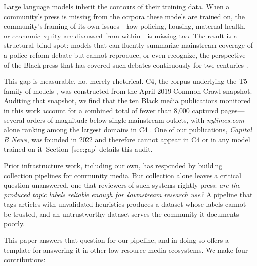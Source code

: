 \documentclass[letterpaper,twocolumn,10pt]{article}
\begin{document}
Large language models inherit the contours of their training data. When a
community's press is missing from the corpora these models are trained on,
the community's framing of its own issues---how policing, housing,
maternal health, or economic equity are discussed from within---is missing
too. The result is a structural blind spot: models that can fluently
summarize mainstream coverage of a police-reform debate but cannot
reproduce, or even recognize, the perspective of the Black press that has
covered such debates continuously for two centuries
\cite{washburn2006}.

This gap is measurable, not merely rhetorical. C4, the corpus underlying
the T5 family of models \cite{raffel2020}, was constructed from the April
2019 Common Crawl snapshot. Auditing that snapshot, we find that the ten
Black media publications monitored in this work account for a combined
total of fewer than 8{,}000 captured pages---several orders of magnitude
below single mainstream outlets, with \emph{nytimes.com} alone ranking
among the largest domains in C4 \cite{dodge2021}. One of our publications,
\emph{Capital B News}, was founded in 2022 and therefore cannot appear in
C4 or in any model trained on it. Section~\ref{sec:gap} details this audit.

Prior infrastructure work, including our own, has responded by building
collection pipelines for community media. But collection alone leaves a
critical question unanswered, one that reviewers of such systems rightly
press: \emph{are the produced topic labels reliable enough for downstream
research use?} A pipeline that tags articles with unvalidated heuristics
produces a dataset whose labels cannot be trusted, and an untrustworthy
dataset serves the community it documents poorly.

This paper answers that question for our pipeline, and in doing so offers
a template for answering it in other low-resource media ecosystems. We
make four contributions:
\end{document}
